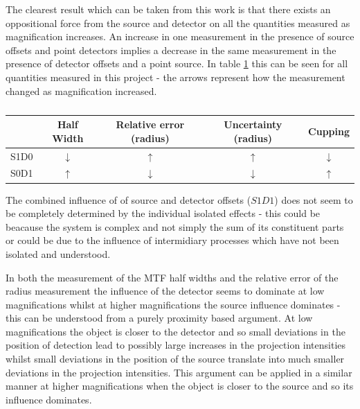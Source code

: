 \documentclass[
  twoside,
  11pt, a4paper,
  footinclude=true,
  headinclude=true,
  cleardoublepage=empty
]{scrbook}
\begin{document}
The clearest result which can be taken from this work is that there exists an oppositional force from the source and detector on all the quantities measured as magnification increases. An increase in one measurement in the presence of source offsets and point detectors implies a decrease in the same measurement in the presence of detector offsets and a point source. In table \ref{upsanddowns} this can be seen for all quantities measured in this project - the arrows represent how the measurement changed as magnification increased.

\begin{table}
\caption{}
\label{upsanddowns}
\begin{tabular}{c|cccc}
\toprule
{}  &     Half Width &     Relative error (radius)  &  Uncertainty (radius) &  Cupping\\
\midrule
S1D0     &    $\downarrow$ & $\uparrow$ & $\uparrow$ & $\downarrow$ \\
S0D1     &    $\uparrow$ & $\downarrow$ & $\downarrow$ & $\uparrow$ \\
\bottomrule
\end{tabular}
\end{table}

The combined influence of of source and detector offsets ($S1D1$) does not seem to be completely determined by the individual isolated effects - this could be beacause the system is complex and not simply the sum of its constituent parts or could be due to the influence of intermidiary processes which have not been isolated and understood.

In both the measurement of the MTF half widths and the relative error of the radius measurement the influence of the detector seems to dominate at low magnifications whilst at higher magnifications the source influence dominates - this can be understood from a purely proximity based argument. At low magnifications the object is closer to the detector and so small deviations in the position of detection lead to possibly large increases in the projection intensities whilst small deviations in the position of the source translate into much smaller deviations in the projection intensities. This argument can be applied in a similar manner at higher magnifications when the object is closer to the source and so its influence dominates.
\end{document}
